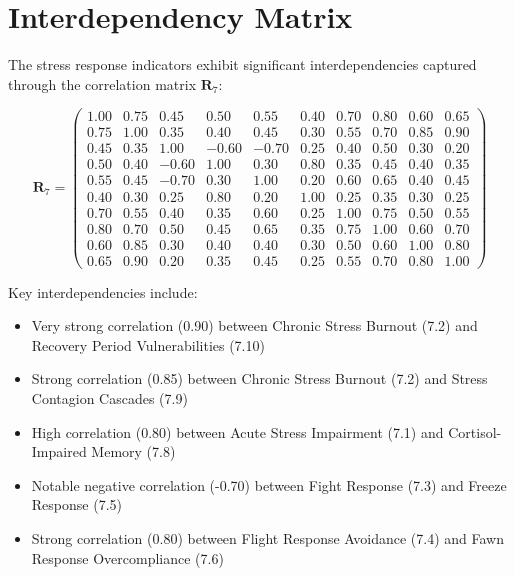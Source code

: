 \documentclass[11pt,a4paper]{article}
\begin{document}
\section{Interdependency Matrix}

The stress response indicators exhibit significant interdependencies captured through the correlation matrix $\mathbf{R}_{7}$:

\begin{equation}
\mathbf{R}_7 = \begin{pmatrix}
1.00 & 0.75 & 0.45 & 0.50 & 0.55 & 0.40 & 0.70 & 0.80 & 0.60 & 0.65 \\
0.75 & 1.00 & 0.35 & 0.40 & 0.45 & 0.30 & 0.55 & 0.70 & 0.85 & 0.90 \\
0.45 & 0.35 & 1.00 & -0.60 & -0.70 & 0.25 & 0.40 & 0.50 & 0.30 & 0.20 \\
0.50 & 0.40 & -0.60 & 1.00 & 0.30 & 0.80 & 0.35 & 0.45 & 0.40 & 0.35 \\
0.55 & 0.45 & -0.70 & 0.30 & 1.00 & 0.20 & 0.60 & 0.65 & 0.40 & 0.45 \\
0.40 & 0.30 & 0.25 & 0.80 & 0.20 & 1.00 & 0.25 & 0.35 & 0.30 & 0.25 \\
0.70 & 0.55 & 0.40 & 0.35 & 0.60 & 0.25 & 1.00 & 0.75 & 0.50 & 0.55 \\
0.80 & 0.70 & 0.50 & 0.45 & 0.65 & 0.35 & 0.75 & 1.00 & 0.60 & 0.70 \\
0.60 & 0.85 & 0.30 & 0.40 & 0.40 & 0.30 & 0.50 & 0.60 & 1.00 & 0.80 \\
0.65 & 0.90 & 0.20 & 0.35 & 0.45 & 0.25 & 0.55 & 0.70 & 0.80 & 1.00
\end{pmatrix}
\end{equation}

Key interdependencies include:
\begin{itemize}
\item Very strong correlation (0.90) between Chronic Stress Burnout (7.2) and Recovery Period Vulnerabilities (7.10)
\item Strong correlation (0.85) between Chronic Stress Burnout (7.2) and Stress Contagion Cascades (7.9)
\item High correlation (0.80) between Acute Stress Impairment (7.1) and Cortisol-Impaired Memory (7.8)
\item Notable negative correlation (-0.70) between Fight Response (7.3) and Freeze Response (7.5)
\item Strong correlation (0.80) between Flight Response Avoidance (7.4) and Fawn Response Overcompliance (7.6)
\end{itemize}
\end{document}
